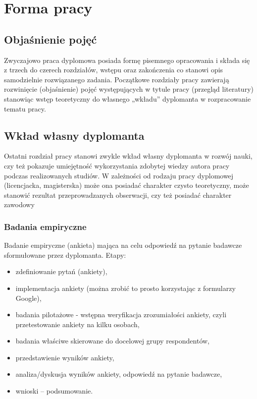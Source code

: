 \chapter{Forma pracy}
\label{chap:forma_pracy}



\section{Objaśnienie pojęć}

Zwyczajowo praca dyplomowa posiada formę pisemnego opracowania i składa się z trzech do czerech rozdziałów, wstępu oraz zakończenia co stanowi opis samodzielnie rozwiązanego zadania. Początkowe rozdziały pracy zawierają rozwinięcie (objaśnienie) pojęć występujących w tytule pracy (przegląd literatury) stanowiąc wstęp teoretyczny do własnego „wkładu” dyplomanta w rozpracowanie tematu pracy.



\section{Wkład własny dyplomanta}

Ostatni rozdział pracy stanowi zwykle wkład własny dyplomanta w rozwój nauki, czy też pokazuje umiejętność wykorzystania zdobytej wiedzy autora pracy podczas realizowanych studiów. W zależności od rodzaju pracy dyplomowej (licencjacka, magisterska) może ona posiadać charakter czysto teoretyczny, może stanowić rezultat przeprowadzanych obserwacji, czy też posiadać charakter zawodowy


\subsection{Badania empiryczne}

Badanie empiryczne (ankieta) mająca na celu odpowiedź na pytanie badawcze sformułowane przez dyplomanta. Etapy:

\begin{itemize}
	\item zdefiniowanie pytań (ankiety),
	\item implementacja ankiety (można zrobić to prosto korzystając z formularzy Google),
	\item badania pilotażowe - wstępna weryfikacja zrozumiałości ankiety, czyli przetestowanie ankiety na kilku osobach,
	\item badania właściwe skierowane do docelowej grupy respondentów,
	\item przedstawienie wyników ankiety, 
	\item analiza/dyskusja wyników ankiety, odpowiedź na pytanie badawcze,
	\item wnioski – podsumowanie.
\end{itemize}


